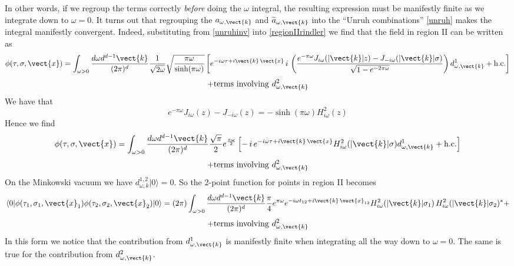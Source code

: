 In other words, if we regroup the terms correctly {\it before} doing the $\omega$ integral, the resulting expression must be manifestly finite as we integrate down to $\omega=0$. It turns out that regrouping the $a_{\omega,\vect{k}}$ and $\widetilde{a}_{\omega,\vect{k}}$ into the ``Unruh combinations'' \eqref{unruh} makes the integral manifestly convergent. Indeed, substituting from \eqref{unruhinv} into \eqref{regionIIrindler} we find that the field in region II can be written as
\[
\phi(\tau,\sigma,\vect{x})= \int_{\omega>0} {d\omega d^{d-1}\vect{k}  \over (2 \pi)^d} {1\over \sqrt{2\omega}}\sqrt{\pi \omega\over \sinh(\pi \omega)}\left[e^{-i\omega \tau + i \vect{k} \, \vect{x}}\,i\, \left({
e^{-\pi \omega}J_{i\omega}(|\vect{k}|z) - J_{-i\omega}(|\vect{k}|\sigma)\over \sqrt{1-e^{-2\pi \omega}}}\right)d^1_{\omega,\vect{k}} + {\rm h.c.} \right]
 \]
\[
+{\rm terms\,\,involving\,\,}d^2_{\omega,\vect{k}}
\]
We have that
\[
e^{-\pi \omega}J_{i\omega}(z) - J_{-i\omega}(z) = -\sinh (\pi \omega)H^2_{i\omega}(z)
\]
Hence we find
\[
 \phi(\tau,\sigma,\vect{x}) = \int_{\omega>0} {d\omega d^{d-1}\vect{k} \over (2 \pi)^d} {\sqrt{\pi}\over 2}e^{\pi \omega\over 2}\left[-\,i \,e^{-i\omega \tau + i \vect{k} \,\vect{x}} 
 H^2_{i\omega}(|\vect{k}|\sigma) d^1_{\omega,\vect{k}}
 + {\rm h.c.} \right]
\]
\[
+{\rm terms\,\,involving\,\,}d^2_{\omega,\vect{k}}
\]
On the Minkowski vacuum we have $d^{1,2}_{\omega,k} |0\rangle = 0$. So the 2-point function for points in region II becomes
\[
\langle 0| \phi(\tau_1,\sigma_1,\vect{x}_1) \phi(\tau_2,\sigma_2,\vect{x}_2) |0\rangle = (2\pi)\int_{\omega>0}{d\omega d^{d-1} \vect{k} \over (2 \pi)^d} {\pi \over 4} e^{\pi \omega}
e^{-i\omega t_{12}+i \vect{k}\, \vect{x}_{12}} H^2_{i \omega}(|\vect{k}|\sigma_1)\,H^2_{i\omega}(|\vect{k}|\sigma_2)^* +\]
\[
+{\rm terms\,\,involving\,\,}d^2_{\omega,\vect{k}}
\]
In this form we notice that the contribution from
$d^1_{\omega,\vect{k}}$ is manifestly finite when integrating all the
way down to $\omega=0$. The same is true for the contribution from $d^2_{\omega,\vect{k}}$.



